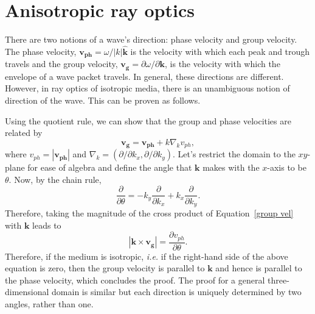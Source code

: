 	\section{Anisotropic ray optics}
	\label{sec: aniso ray}
		
	There are two notions of a wave's direction: phase velocity and group velocity. The phase velocity, $\mathbf{v_{ph}} = \omega / |k| \mathbf{\hat{k}}$ is the velocity with which each peak and trough travels and the group velocity, $\mathbf{v_g} = \partial \omega / \partial \mathbf{k}$, is the velocity with which the envelope of a wave packet travels. In general, these directions are different. However, in ray optics of isotropic media, there is an unambiguous notion of direction of the wave. This can be proven as follows.
	
	Using the quotient rule, we can show that the group and phase velocities are related by
	\begin{equation}
	\mathbf{v_g} = \mathbf{v_{ph}} + k\nabla_k v_{ph}, \label{group vel}
	\end{equation}
	where $v_{ph} = |\mathbf{v_{ph}}|$ and $\nabla_k = (\partial/\partial k_x, \partial/\partial k_y)$. Let's restrict the domain to the $xy$-plane for ease of algebra and define the angle that $\mathbf{k}$ makes with the $x$-axis to be $\theta$. Now, by the chain rule,
	\begin{equation}
	\frac{\partial}{\partial \theta} = -k_y \frac{\partial}{\partial k_x} + k_x \frac{\partial}{\partial k_y}.
	\end{equation}
	Therefore, taking the magnitude of the cross product of Equation~\eqref{group vel} with $\mathbf{k}$ leads to
	\begin{equation}
	|\mathbf{k} \times \mathbf{v_g}| = \frac{\partial v_{ph}}{\partial \theta}.
	\end{equation}
	Therefore, if the medium is isotropic, \textit{i.e.} if the right-hand side of the above equation is zero, then the group velocity is parallel to $\mathbf{k}$ and hence is parallel to the phase velocity, which concludes the proof. The proof for a general three-dimensional domain is similar but each direction is uniquely determined by two angles, rather than one.
	

